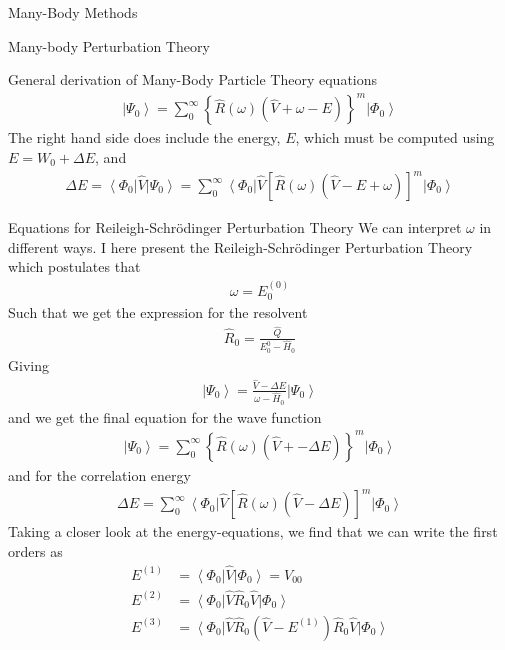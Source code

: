 \documentclass[twoside,english]{uiofysmaster}
\begin{document}
\begin{chapter}{Many-Body Methods}
\begin{section}{Many-body Perturbation Theory}
\begin{subsection}{General derivation of Many-Body Particle Theory equations}
	 		\begin{align}
	 			\left| \Psi_0 \right> = \sum_0^\infty \left\{ \hat R(\omega) (\hat V + \omega - E) \right\}^m \left| \Phi_0 \right>
	 		\end{align}
	 		The right hand side does include the energy, $E$, which must be computed using $ E = W_0 + \Delta E$, and
	 		\begin{align}
	 			\Delta E = \left< \Phi_0 \right| \hat V \left| \Psi_0 \right> 
	 			= \sum_0^\infty \left< \Phi_0 \right| \hat V \left[ \hat R(\omega) (\hat V - E + \omega) \right]^m \left| \Phi_0 \right>  
	 		\end{align}
	 	\end{subsection}

	 	\begin{subsection}{Equations for Reileigh-Schr\"{o}dinger Perturbation Theory}
	 		We can interpret $\omega$ in different ways. I here present the Reileigh-Schr\"{o}dinger Perturbation Theory which postulates that
	 		\begin{align}
	 			\omega = E_0^{(0)}
	 		\end{align}
	 		Such that we get the expression for the resolvent
	 		\begin{align}
	 			\hat R_0 = \frac{\hat Q}{E_0^{0} - \hat H_0}
	 		\end{align}
	 		Giving
	 		\begin{align}
	 			\left| \Psi_0 \right> = \frac{ \hat V - \Delta E }{\omega - \hat H_0} \left| \Psi_0 \right>
	 		\end{align}
	 		and we get the final equation for the wave function 
	 		\begin{align}
	 			\left| \Psi_0 \right> = \sum_0^\infty \left\{ \hat R(\omega) (\hat V + - \Delta E) \right\}^m \left| \Phi_0 \right>
	 		\end{align}
	 		and for the correlation energy
	 		\begin{align}
	 			\Delta E = \sum_0^\infty \left< \Phi_0 \right| \hat V \left[ \hat R(\omega) (\hat V - \Delta E) \right]^m \left| \Phi_0 \right>  
	 		\end{align}
	 		Taking a closer look at the energy-equations, we find that we can write the first orders as
	 		\begin{align*}
	 			E^{(1)} &= \left< \Phi_0 \right| \hat V \left| \Phi_0 \right>  = V_{00}\\
	 			E^{(2)} &= \left< \Phi_0 \right| \hat V \hat R_0 \hat V \left| \Phi_0 \right> \\
	 			E^{(3)} &= \left< \Phi_0 \right| \hat V \hat R_0 (\hat V - E^{(1)})  \hat R_0 \hat V \left| \Phi_0 \right> \\

\end{align*}
\end{subsection}
\end{section}
\end{chapter}
\end{document}

